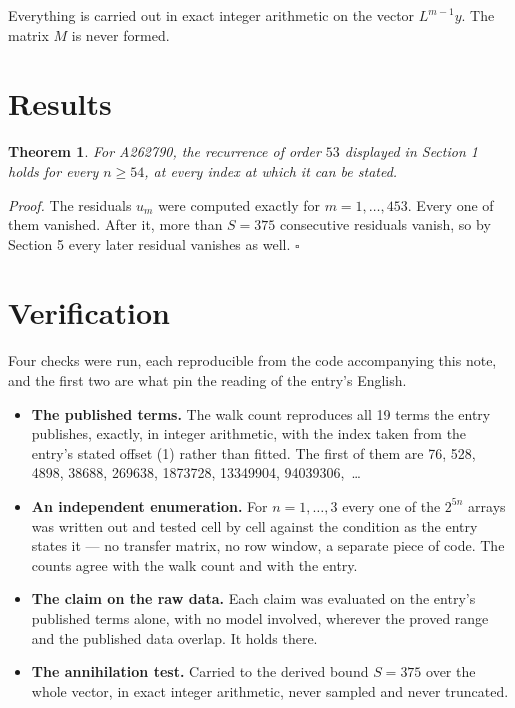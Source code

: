 \documentclass[11pt]{article}
\newtheorem{theorem}{Theorem}
\theoremstyle{definition}
\begin{document}
Everything is carried out in exact integer arithmetic on the vector $L^{m-1}y$. The matrix $M$ is never formed.

\section{Results}

\begin{theorem} For A262790, the recurrence of order $53$ displayed in Section 1 holds for every $n \ge 54$, at every index at which it can be stated.\end{theorem}

{\itshape Proof.} The residuals $u_m$ were computed exactly for $m = 1,\dots,453$. Every one of them vanished. After it, more than $S = 375$ consecutive residuals vanish, so by Section 5 every later residual vanishes as well. $\square$

\section{Verification}

Four checks were run, each reproducible from the code accompanying this note, and the first two are what pin the reading of the entry's English.

\begin{itemize}

\item {\bfseries The published terms.} The walk count reproduces all 19 terms the entry publishes, exactly, in integer arithmetic, with the index taken from the entry's stated offset (1) rather than fitted. The first of them are 76, 528, 4898, 38688, 269638, 1873728, 13349904, 94039306,~\dots

\item {\bfseries An independent enumeration.} For $n = 1,\dots,3$ every one of the $2^{5n}$ arrays was written out and tested cell by cell against the condition as the entry states it --- no transfer matrix, no row window, a separate piece of code. The counts agree with the walk count and with the entry.

\item {\bfseries The claim on the raw data.} Each claim was evaluated on the entry's published terms alone, with no model involved, wherever the proved range and the published data overlap. It holds there.

\item {\bfseries The annihilation test.} Carried to the derived bound $S = 375$ over the whole vector, in exact integer arithmetic, never sampled and never truncated.

\end{itemize}
\end{document}
